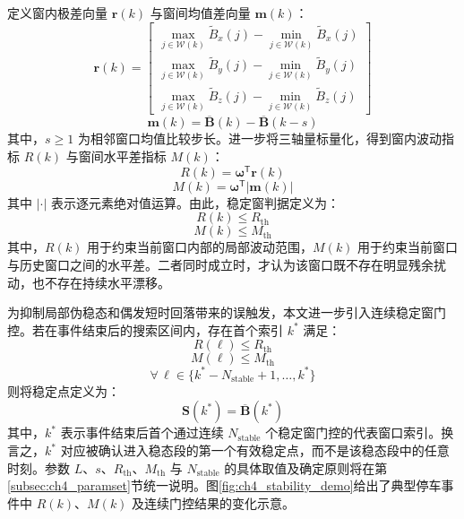 \documentclass{xdupgthesis}
\begin{document}
定义窗内极差向量 $\mathbf{r}(k)$ 与窗间均值差向量 $\mathbf{m}(k)$：
\begin{equation}
    \mathbf{r}(k)=\begin{bmatrix}
        \max\limits_{j\in\mathcal{W}(k)}\widetilde{B}_x(j)-\min\limits_{j\in\mathcal{W}(k)}\widetilde{B}_x(j)\\
        \max\limits_{j\in\mathcal{W}(k)}\widetilde{B}_y(j)-\min\limits_{j\in\mathcal{W}(k)}\widetilde{B}_y(j)\\
        \max\limits_{j\in\mathcal{W}(k)}\widetilde{B}_z(j)-\min\limits_{j\in\mathcal{W}(k)}\widetilde{B}_z(j)
    \end{bmatrix}
\end{equation}
\begin{equation}
    \mathbf{m}(k)=\overline{\mathbf{B}}(k)-\overline{\mathbf{B}}(k-s)
\end{equation}
其中，$s\ge 1$ 为相邻窗口均值比较步长。进一步将三轴量标量化，得到窗内波动指标 $R(k)$ 与窗间水平差指标 $M(k)$：
\begin{equation}
    R(k)=\boldsymbol{\omega}^{\mathsf{T}}\mathbf{r}(k)
\end{equation}
\begin{equation}
    M(k)=\boldsymbol{\omega}^{\mathsf{T}}\left|\mathbf{m}(k)\right|
\end{equation}
其中 $|\cdot|$ 表示逐元素绝对值运算。由此，稳定窗判据定义为：
\begin{equation}
    R(k)\le R_{\mathrm{th}}
\end{equation}
\begin{equation}
    M(k)\le M_{\mathrm{th}}
\end{equation}
其中，$R(k)$ 用于约束当前窗口内部的局部波动范围，$M(k)$ 用于约束当前窗口与历史窗口之间的水平差。二者同时成立时，才认为该窗口既不存在明显残余扰动，也不存在持续水平漂移。

为抑制局部伪稳态和偶发短时回落带来的误触发，本文进一步引入连续稳定窗门控。若在事件结束后的搜索区间内，存在首个索引 $k^\ast$ 满足：
\begin{equation}
    R(\ell)\le R_{\mathrm{th}}
\end{equation}
\begin{equation}
    M(\ell)\le M_{\mathrm{th}}
\end{equation}
\begin{equation}
    \forall\,\ell\in\{k^\ast-N_{\mathrm{stable}}+1,\ldots,k^\ast\}
\end{equation}
则将稳定点定义为：
\begin{equation}
    \mathbf{S}(k^\ast)=\overline{\mathbf{B}}(k^\ast)
\end{equation}
其中，$k^\ast$ 表示事件结束后首个通过连续 $N_{\mathrm{stable}}$ 个稳定窗门控的代表窗口索引。换言之，$k^\ast$ 对应被确认进入稳态段的第一个有效稳定点，而不是该稳态段中的任意时刻。参数 $L$、$s$、$R_{\mathrm{th}}$、$M_{\mathrm{th}}$ 与 $N_{\mathrm{stable}}$ 的具体取值及确定原则将在第\ref{subsec:ch4_paramset}节统一说明。图\ref{fig:ch4_stability_demo}给出了典型停车事件中 $R(k)$、$M(k)$ 及连续门控结果的变化示意。
\end{document}
